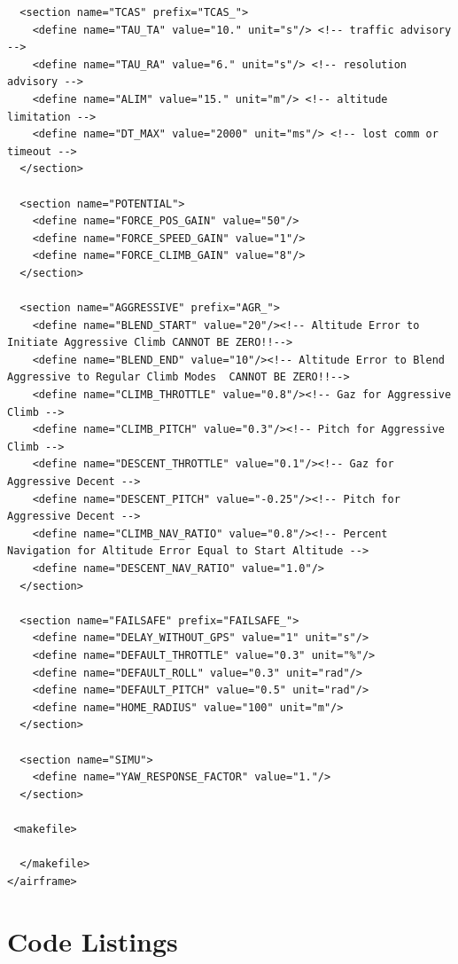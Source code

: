 \documentclass[a4paper,11pt]{report}
\begin{document}
\begin{lstlisting}
  <section name="TCAS" prefix="TCAS_">
    <define name="TAU_TA" value="10." unit="s"/> <!-- traffic advisory -->
    <define name="TAU_RA" value="6." unit="s"/> <!-- resolution advisory -->
    <define name="ALIM" value="15." unit="m"/> <!-- altitude limitation -->
    <define name="DT_MAX" value="2000" unit="ms"/> <!-- lost comm or timeout -->
  </section>

  <section name="POTENTIAL">
    <define name="FORCE_POS_GAIN" value="50"/>
    <define name="FORCE_SPEED_GAIN" value="1"/>
    <define name="FORCE_CLIMB_GAIN" value="8"/>
  </section>

  <section name="AGGRESSIVE" prefix="AGR_">
    <define name="BLEND_START" value="20"/><!-- Altitude Error to Initiate Aggressive Climb CANNOT BE ZERO!!-->
    <define name="BLEND_END" value="10"/><!-- Altitude Error to Blend Aggressive to Regular Climb Modes  CANNOT BE ZERO!!-->
    <define name="CLIMB_THROTTLE" value="0.8"/><!-- Gaz for Aggressive Climb -->
    <define name="CLIMB_PITCH" value="0.3"/><!-- Pitch for Aggressive Climb -->
    <define name="DESCENT_THROTTLE" value="0.1"/><!-- Gaz for Aggressive Decent -->
    <define name="DESCENT_PITCH" value="-0.25"/><!-- Pitch for Aggressive Decent -->
    <define name="CLIMB_NAV_RATIO" value="0.8"/><!-- Percent Navigation for Altitude Error Equal to Start Altitude -->
    <define name="DESCENT_NAV_RATIO" value="1.0"/>
  </section>

  <section name="FAILSAFE" prefix="FAILSAFE_">
    <define name="DELAY_WITHOUT_GPS" value="1" unit="s"/>
    <define name="DEFAULT_THROTTLE" value="0.3" unit="%"/>
    <define name="DEFAULT_ROLL" value="0.3" unit="rad"/>
    <define name="DEFAULT_PITCH" value="0.5" unit="rad"/>
    <define name="HOME_RADIUS" value="100" unit="m"/>
  </section>

  <section name="SIMU">
    <define name="YAW_RESPONSE_FACTOR" value="1."/>
  </section>

 <makefile>

  </makefile>
</airframe>
\end{lstlisting}

\chapter{Code Listings}

\end{document}
